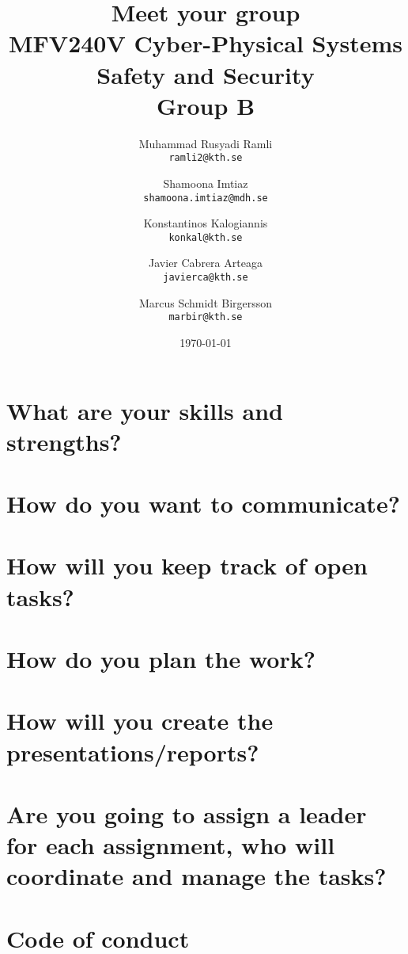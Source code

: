 \documentclass{article}
\title{Meet your group \\ \large MFV240V Cyber-Physical Systems Safety and Security \\ Group B}
\author{
  \and
  Muhammad Rusyadi Ramli\\
  \texttt{ramli2@kth.se}
  \and
  Shamoona Imtiaz\\
  \texttt{shamoona.imtiaz@mdh.se}
  \and
  Konstantinos Kalogiannis\\
  \texttt{konkal@kth.se}
  \and
  Javier Cabrera Arteaga\\
  \texttt{javierca@kth.se}
  \and
  Marcus Schmidt Birgersson\\
  \texttt{marbir@kth.se}
}
\date{\today}
\begin{document}
\maketitle

\section{What are your skills and strengths?}

\section{How do you want to communicate?}

\section{How will you keep track of open tasks?}


\section{How do you plan the work?}

    

\section{How will you create the presentations/reports?}


\section{Are you going to assign a leader for each assignment, who will coordinate and manage the tasks?}

\section{Code of conduct}



%
\end{document}
